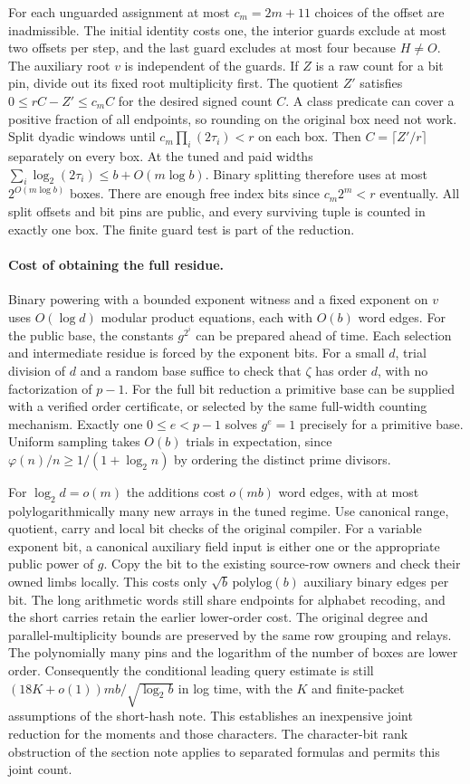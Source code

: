 \documentclass[11pt]{article}
\begin{document}
For each unguarded assignment at most $c_m=2m+11$ choices of the
offset are inadmissible. The initial identity costs one, the
interior guards exclude at most two offsets per step, and the
last guard excludes at most four because $H\ne O$. The auxiliary
root $v$ is independent of the guards. If $Z$ is a raw count for
a bit pin, divide out its fixed root multiplicity first. The
quotient $Z'$ satisfies $0\le rC-Z'\le c_m C$ for the desired
signed count $C$. A class predicate can cover a positive fraction
of all endpoints, so rounding on the original box need not work.
Split dyadic windows until $c_m\prod_i(2\tau_i)<r$ on each box.
Then $C=\lceil Z'/r\rceil$ separately on every box. At the tuned
and paid widths $\sum_i\log_2(2\tau_i)\le b+O(m\log b)$.
Binary splitting therefore uses at most $2^{O(m\log b)}$ boxes.
There are enough free index bits since $c_m2^m<r$ eventually.
All split offsets and bit pins are public, and every surviving
tuple is counted in exactly one box. The finite guard test is
part of the reduction.

\paragraph{Cost of obtaining the full residue.}
Binary powering with a bounded exponent witness and a fixed
exponent on $v$ uses $O(\log d)$ modular product equations, each
with $O(b)$ word edges. For the public base, the constants
$g^{2^i}$ can be prepared ahead of time. Each selection and
intermediate residue is forced by the exponent bits. For a small
$d$, trial division of $d$ and a random base suffice to check that
$\zeta$ has order $d$, with no factorization of $p-1$. For the
full bit reduction a primitive base can be supplied with a
verified order certificate, or selected by the same full-width
counting mechanism. Exactly one $0\le e<p-1$ solves $g^e=1$
precisely for a primitive base. Uniform sampling takes $O(b)$
trials in expectation, since $\varphi(n)/n\ge1/(1+\log_2 n)$
by ordering the distinct prime divisors.

For $\log_2 d=o(m)$ the additions cost $o(mb)$ word edges, with
at most polylogarithmically many new arrays in the tuned regime.
Use canonical range, quotient, carry and local bit checks of the
original compiler. For a variable exponent bit, a canonical
auxiliary field input is either one or the appropriate public
power of $g$. Copy the bit to the existing source-row owners and
check their owned limbs locally. This costs only
$\sqrt b\,\mathrm{polylog}(b)$ auxiliary binary edges per bit.
The long arithmetic words still share endpoints for alphabet
recoding, and the short carries retain the earlier lower-order cost.
The original degree and parallel-multiplicity bounds are preserved
by the same row grouping and relays. The polynomially many pins
and the logarithm of the number of boxes are lower order.
Consequently the conditional leading query estimate is still
$(18K+o(1))mb/\sqrt{\log_2 b}$ in log time, with the $K$ and
finite-packet assumptions of the short-hash note. This establishes
an inexpensive joint reduction for the moments and those
characters. The character-bit rank obstruction of the section note
applies to separated formulas and permits this joint count.
\end{document}

